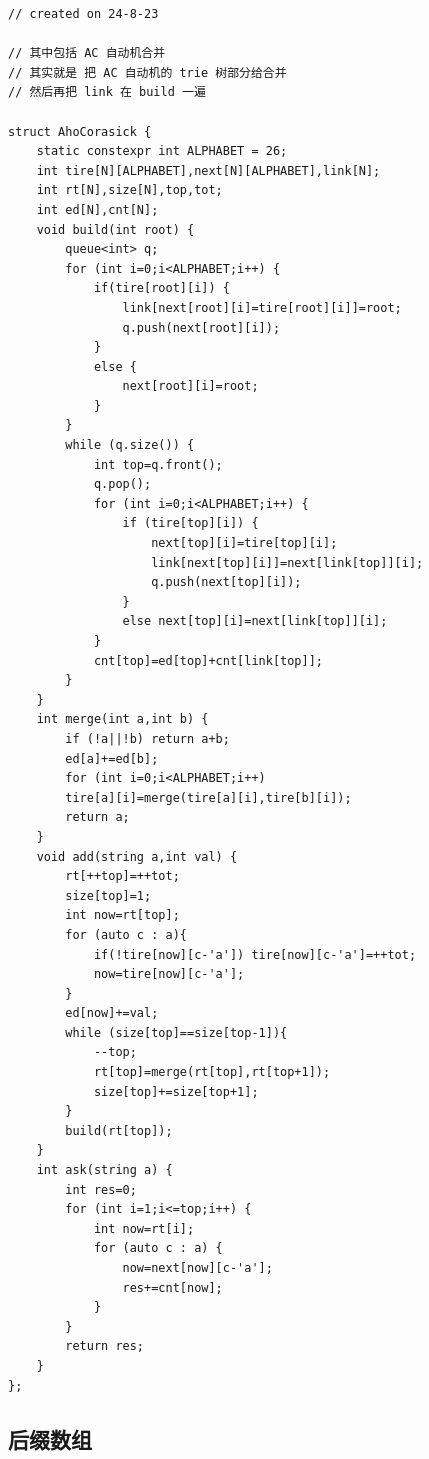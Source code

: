 \documentclass[a4paper,12pt]{article}
\begin{document}
\begin{lstlisting}
// created on 24-8-23

// 其中包括 AC 自动机合并
// 其实就是 把 AC 自动机的 trie 树部分给合并
// 然后再把 link 在 build 一遍

struct AhoCorasick {
    static constexpr int ALPHABET = 26;
    int tire[N][ALPHABET],next[N][ALPHABET],link[N];
    int rt[N],size[N],top,tot;
    int ed[N],cnt[N];
    void build(int root) {
        queue<int> q;
        for (int i=0;i<ALPHABET;i++) {
            if(tire[root][i]) {
                link[next[root][i]=tire[root][i]]=root;
                q.push(next[root][i]);
            }
            else {
                next[root][i]=root;
            }
        }
        while (q.size()) {
            int top=q.front();
            q.pop();
            for (int i=0;i<ALPHABET;i++) {
                if (tire[top][i]) {
                    next[top][i]=tire[top][i];
                    link[next[top][i]]=next[link[top]][i];
                    q.push(next[top][i]);
                }
                else next[top][i]=next[link[top]][i];
            }
            cnt[top]=ed[top]+cnt[link[top]];
        }
    }
    int merge(int a,int b) {
        if (!a||!b) return a+b;
        ed[a]+=ed[b];
        for (int i=0;i<ALPHABET;i++)
        tire[a][i]=merge(tire[a][i],tire[b][i]);
        return a;
    }
    void add(string a,int val) {
        rt[++top]=++tot;
        size[top]=1;
        int now=rt[top];
        for (auto c : a){
            if(!tire[now][c-'a']) tire[now][c-'a']=++tot;
            now=tire[now][c-'a'];
        }
        ed[now]+=val;
        while (size[top]==size[top-1]){
            --top;
            rt[top]=merge(rt[top],rt[top+1]);
            size[top]+=size[top+1];
        }
        build(rt[top]);
    }
    int ask(string a) {
        int res=0;
        for (int i=1;i<=top;i++) {
            int now=rt[i];
            for (auto c : a) {
                now=next[now][c-'a'];
                res+=cnt[now];
            }
        }
        return res;
    }
};
\end{lstlisting}

\subsection{后缀数组}
\end{document}
